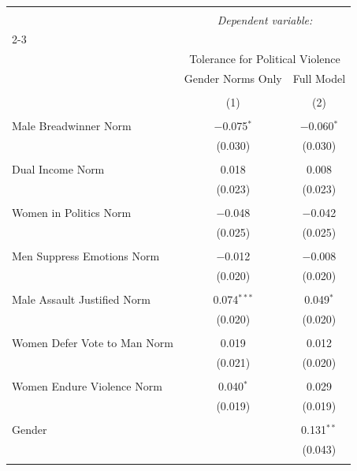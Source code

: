 
\begin{table}[!htbp] \centering 
  \caption{} 
  \label{} 
\begin{tabular}{@{\extracolsep{5pt}}lcc} 
\\[-1.8ex]\hline 
\hline \\[-1.8ex] 
 & \multicolumn{2}{c}{\textit{Dependent variable:}} \\ 
\cline{2-3} 
\\[-1.8ex] & \multicolumn{2}{c}{Tolerance for Political Violence} \\ 
 & Gender Norms Only & Full Model \\ 
\\[-1.8ex] & (1) & (2)\\ 
\hline \\[-1.8ex] 
 Male Breadwinner Norm & $-$0.075$^{*}$ & $-$0.060$^{*}$ \\ 
  & (0.030) & (0.030) \\ 
  & & \\ 
 Dual Income Norm & 0.018 & 0.008 \\ 
  & (0.023) & (0.023) \\ 
  & & \\ 
 Women in Politics Norm & $-$0.048 & $-$0.042 \\ 
  & (0.025) & (0.025) \\ 
  & & \\ 
 Men Suppress Emotions Norm & $-$0.012 & $-$0.008 \\ 
  & (0.020) & (0.020) \\ 
  & & \\ 
 Male Assault Justified Norm & 0.074$^{***}$ & 0.049$^{*}$ \\ 
  & (0.020) & (0.020) \\ 
  & & \\ 
 Women Defer Vote to Man Norm & 0.019 & 0.012 \\ 
  & (0.021) & (0.020) \\ 
  & & \\ 
 Women Endure Violence Norm & 0.040$^{*}$ & 0.029 \\ 
  & (0.019) & (0.019) \\ 
  & & \\ 
 Gender &  & 0.131$^{**}$ \\ 
  &  & (0.043) \\ 
  & & \\ 

\end{tabular}
\end{table}
